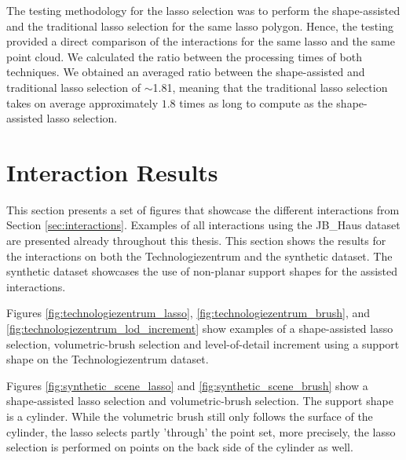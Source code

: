 The testing methodology for the lasso selection was to perform the shape-assisted and the traditional lasso selection for the same lasso polygon. Hence, the testing provided a direct comparison of the interactions for the same lasso and the same point cloud. We calculated the ratio between the processing times of both techniques. We obtained an averaged ratio between the shape-assisted and traditional lasso selection of $\sim$1.81, meaning that the traditional lasso selection takes on average approximately $1.8$ times as long to compute as the shape-assisted lasso selection. 


\section{Interaction Results}
\label{sec:interaction_results}

This section presents a set of figures that showcase the different interactions from Section \ref{sec:interactions}. Examples of all interactions using the JB\_Haus dataset are presented already throughout this thesis. This section shows the results for the interactions on both the Technologiezentrum and the synthetic dataset. The synthetic dataset showcases the use of non-planar support shapes for the assisted interactions. 

Figures \ref{fig:technologiezentrum_lasso}, \ref{fig:technologiezentrum_brush}, and \ref{fig:technologiezentrum_lod_increment} show examples of a shape-assisted lasso selection, volumetric-brush selection and level-of-detail increment using a support shape on the Technologiezentrum dataset. 

Figures \ref{fig:synthetic_scene_lasso} and \ref{fig:synthetic_scene_brush} show a shape-assisted lasso selection and volumetric-brush selection. The support shape is a cylinder. While the volumetric brush still only follows the surface of the cylinder, the lasso selects partly 'through' the point set, more precisely, the lasso selection is performed on points on the back side of the cylinder as well. 



